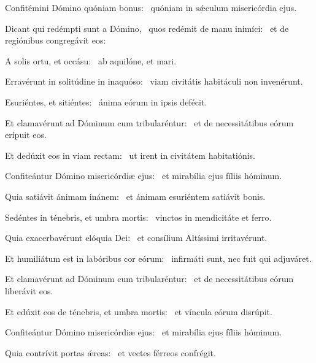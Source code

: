\item Confitémini Dómino quóniam bonus:~\psstar{} quóniam in sǽculum misericórdia ejus.

\item Dicant qui redémpti sunt a Dómino,~\pscross{} quos redémit de manu inimíci:~\psstar{} et de regiónibus congregávit eos:

\item A solis ortu, et occásu:~\psstar{} ab aquilóne, et mari.

\item Erravérunt in solitúdine in inaquóso:~\psstar{} viam civitátis habitáculi non invenérunt.

\item Esuriéntes, et sitiéntes:~\psstar{} ánima eórum in ipsis defécit.

\item Et clamavérunt ad Dóminum cum tribularéntur:~\psstar{} et de necessitátibus eórum erípuit eos.

\item Et dedúxit eos in viam rectam:~\psstar{} ut irent in civitátem habitatiónis.

\item Confiteántur Dómino misericórdiæ ejus:~\psstar{} et mirabília ejus fíliis hóminum.

\item Quia satiávit ánimam inánem:~\psstar{} et ánimam esuriéntem satiávit bonis.

\item Sedéntes in ténebris, et umbra mortis:~\psstar{} vinctos in mendicitáte et ferro.

\item Quia exacerbavérunt elóquia Dei:~\psstar{} et consílium Altíssimi irritavérunt.

\item Et humiliátum est in labóribus cor eórum:~\psstar{} infirmáti sunt, nec fuit qui adjuváret.

\item Et clamavérunt ad Dóminum cum tribularéntur:~\psstar{} et de necessitátibus eórum liberávit eos.

\item Et edúxit eos de ténebris, et umbra mortis:~\psstar{} et víncula eórum disrúpit.

\item Confiteántur Dómino misericórdiæ ejus:~\psstar{} et mirabília ejus fíliis hóminum.

\item Quia contrívit portas ǽreas:~\psstar{} et vectes férreos confrégit.

